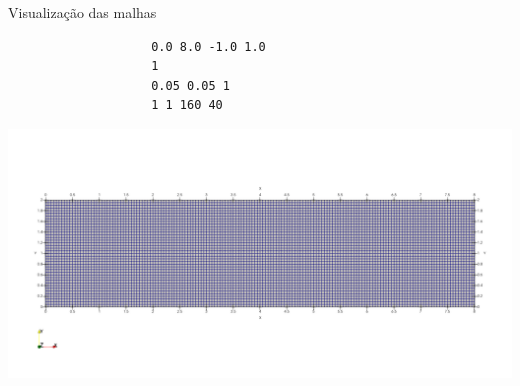 \documentclass[../main/main.tex]{subfiles}
\begin{document}
\begin{frame}[fragile]{\smaller \smaller Visualização das malhas}
	\begin{center}
		\begin{minipage}{0.30\textwidth}
			{\footnotesize
				\begin{verbatim}
					0.0 8.0 -1.0 1.0
					1
					0.05 0.05 1
					1 1 160 40
				\end{verbatim}
			}
		\end{minipage}
		\hfill
		\begin{minipage}{0.65\textwidth}
			\includegraphics[width=\textwidth]{imgs/ref1.png}
		\end{minipage}
	\end{center}
\end{frame}
\end{document}
